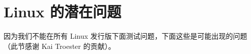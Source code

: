 \section{Linux 的潜在问题}
\fi
\iffalse
\IfLanguageName{english}{
\section{Potential problems under Linux}\index{problems!Linux}
}{}
\IfLanguageName{french}{
\section{Probl\`{e}mes potentiels sous Linux}\index{probl\`{e}mes!Linux}
}{}
\fi

\ifchinese
因为我们不能在所有 Linux 发行版下面测试问题，下面这些是可能出现的问题（此节感谢 Kai Troester 的贡献）。
\fi
\iffalse
\IfLanguageName{english}{
Since we don't have access to all possible flavors of Linux distributions, here are some
thoughts on possible causes of problems. (This Section includes contributions by Kai
Troester.)\index{Troester, Kai}
}{}
\IfLanguageName{french}{
Comme nous n'avons pas acc\`{e}s \`{a} toutes les versions possibles des distributions Linux, voici quelques-
unes des causes possibles de probl\`{e}mes sous cet environnement. (Cette section comprend des contributions
de Kai Troester.)\index{Troester, Kai}
}{}
\fi

